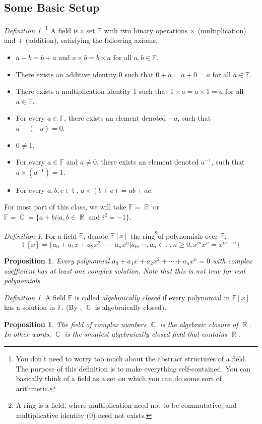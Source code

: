 \documentclass[12pt]{amsart}
\newcommand{\fff}[0]{\mathbb{F}}
\renewcommand{\geq}{\geqslant}
\DeclareMathOperator{\rr}{\mathbb{R}}
\DeclareMathOperator{\cc}{\mathbb{C}}
\newtheorem{proposition}[theorem]{Proposition}
\theoremstyle{remark}
\newtheorem{definition}[theorem]{Definition}
\numberwithin{equation}{section}
\begin{document}
\subsection{Some Basic Setup}
\begin{definition}\footnote{You don't need to worry too much about the abstract structures of a field. The purpose of this definition is to make everything self-contained. You can basically think of a field as a set on which you can do some sort of arithmetic.}
	A field is a set $\fff$ with two binary operations $\times$ (multiplication) and $+$ (addition), satisfying the following axioms.
	\begin{itemize}
	    \item $a+b=b+a$ and $a\times b = b\times a$ for all $a,b\in\fff$.
		\item There exists an additive identity $0$ such that $0+a=a+0 = a$ for all $a\in\fff$.
		\item There exists a multiplication identity $1$ such that $1\times a= a\times 1=a$ for all $a\in\fff$.
		\item For every $a\in\fff$, there exists an element denoted $-a$, such that $a+(-a)=0$.
		\item $0\neq 1$.
		\item For every $a\in\fff$ and $a\neq 0$, there exists an element denoted $a^{-1}$, such that $a\times (a^{-1})=1$.
		\item For every $a,b,c\in\fff$, $a\times (b+c)=ab+ac$.
	\end{itemize}
For most part of this class, we will take $\fff=\rr $  or $\fff=\cc=\{a+bi|a,b\in\rr\text{ and }i^2 = -1\}$.
\end{definition}
\begin{definition}
	For a field $\fff$, denote $\fff[x]$ the ring\footnote{A ring is a field, where multiplication need not to be commutative, and multiplicative identity ($0$) need not exists.}of polynomials over $\fff$. 
	\[\fff[x]=\{a_0+a_1x+a_2x^2+\cdots a_nx^n|a_0,\cdots,a_n\in \fff,n\geq 0, x^mx^n=x^{m+n}\}\]\end{definition} 
\begin{proposition}\label{prop:C_alg_close}
	Every polynomial $a_0+a_1x+a_2x^2+\cdots+a_nx^n = 0$ with complex coefficient has at least one complex solution. Note that this is not true for real polynomials.
\end{proposition}
\begin{definition}
	A field $\fff$ is called \emph{algebraically closed} if every polynomial in $\fff[x]$ has a solution in $\fff$. (By , $\cc$ is algebraically closed).
\end{definition}
\begin{proposition}
	The field of complex numbers $\cc$ is the algebraic closure of $\rr$. In other words, $\cc$ is the smallest algebraically closed field that contains $\rr$.
\end{proposition}
\end{document}
